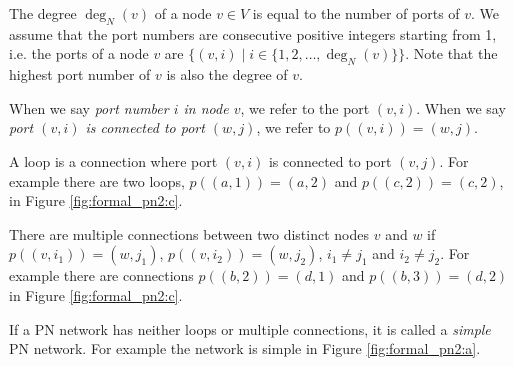 The degree $\deg_N(v)$ of a node $v \in V$ is equal to the number of ports of $v$.
We assume that the port numbers are consecutive positive integers starting from 1, i.e. the ports of a node $v$ are $\{(v, i) \mid i \in \{1, 2, \dotsc, \deg_N(v)\}\}$.
Note that the highest port number of $v$ is also the degree of $v$.

When we say \emph{port number $i$ in node $v$}, we refer to the port $(v, i)$.
When we say \emph{port $(v, i)$ is connected to port $(w, j)$}, we refer to $p((v, i)) = (w, j)$.

A loop is a connection where port $(v, i)$ is connected to port $(v, j)$.
For example there are two loops, $p((a, 1)) = (a, 2)$ and $p((c,2)) = (c,2)$, in Figure \ref{fig:formal_pn2:c}.

There are multiple connections between two distinct nodes $v$ and $w$ if $p((v, i_1)) = (w, j_1)$, $p((v, i_2)) = (w, j_2)$, $i_1 \neq j_1$ and $i_2 \neq j_2$.
For example there are connections $p((b, 2)) = (d, 1)$ and $p((b, 3)) = (d, 2)$ in Figure \ref{fig:formal_pn2:c}.

If a PN network has neither loops or multiple connections, it is called a \emph{simple} PN network.
For example the network is simple in Figure \ref{fig:formal_pn2:a}.



